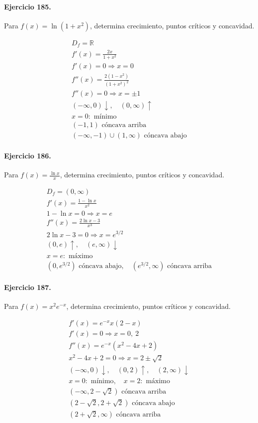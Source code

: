 \documentclass[11pt,a4paper]{article}
\begin{document}
\paragraph{Ejercicio 185.} Para $f(x)=\ln(1+x^2)$, determina crecimiento, puntos críticos y concavidad.

\[
\begin{aligned}
D_f=\mathbb{R}\\
f'(x)=\frac{2x}{1+x^2}\\
f'(x)=0\Rightarrow x=0\\
f''(x)=\frac{2(1-x^2)}{(1+x^2)^2}\\
f''(x)=0\Rightarrow x=\pm1\\
(-\infty,0)\downarrow,\quad(0,\infty)\uparrow\\
x=0:\text{{ mínimo}}\\
(-1,1)\text{{ cóncava arriba}}\\
(-\infty,-1)\cup(1,\infty)\text{{ cóncava abajo}}
\end{aligned}
\]


\paragraph{Ejercicio 186.} Para $f(x)=\frac{\ln x}{x}$, determina crecimiento, puntos críticos y concavidad.

\[
\begin{aligned}
D_f=(0,\infty)\\
f'(x)=\frac{1-\ln x}{x^2}\\
1-\ln x=0\Rightarrow x=e\\
f''(x)=\frac{2\ln x-3}{x^3}\\
2\ln x-3=0\Rightarrow x=e^{3/2}\\
(0,e)\uparrow,\quad(e,\infty)\downarrow\\
x=e:\text{{ máximo}}\\
(0,e^{3/2})\text{{ cóncava abajo}},\quad(e^{3/2},\infty)\text{{ cóncava arriba}}
\end{aligned}
\]


\paragraph{Ejercicio 187.} Para $f(x)=x^2e^{-x}$, determina crecimiento, puntos críticos y concavidad.

\[
\begin{aligned}
f'(x)=e^{-x}x(2-x)\\
f'(x)=0\Rightarrow x=0,\ 2\\
f''(x)=e^{-x}(x^2-4x+2)\\
x^2-4x+2=0\Rightarrow x=2\pm\sqrt2\\
(-\infty,0)\downarrow,\quad(0,2)\uparrow,\quad(2,\infty)\downarrow\\
x=0:\text{{ mínimo}},\quad x=2:\text{{ máximo}}\\
(-\infty,2-\sqrt2)\text{{ cóncava arriba}}\\
(2-\sqrt2,2+\sqrt2)\text{{ cóncava abajo}}\\
(2+\sqrt2,\infty)\text{{ cóncava arriba}}
\end{aligned}
\]
\end{document}
